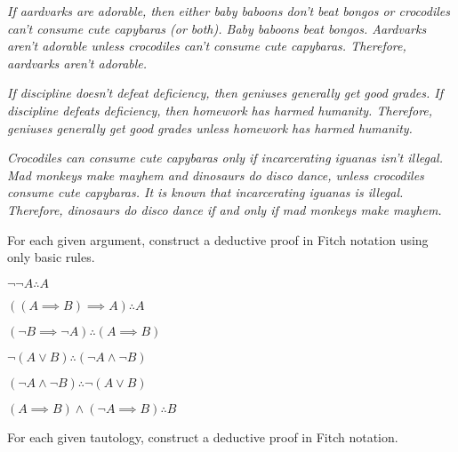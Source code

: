 \documentclass[a4paper,12pt]{article}
\begin{document}
\begin{tasks}
\begin{subtasks}
        \item \textit{If aardvarks are adorable, then either baby baboons don't beat bongos or crocodiles can't consume cute capybaras (or both).
        Baby baboons beat bongos.
        Aardvarks aren't adorable unless crocodiles can't consume cute capybaras.
        Therefore, aardvarks aren't adorable.}

        \item \textit{If discipline doesn't defeat deficiency, then geniuses generally get good grades.
        If discipline defeats deficiency, then homework has harmed humanity.
        Therefore, geniuses generally get good grades unless homework has harmed humanity.}

        \item \textit{Crocodiles can consume cute capybaras only if incarcerating iguanas isn't illegal.
        Mad monkeys make mayhem and dinosaurs do disco dance, unless crocodiles consume cute capybaras.
        It is known that incarcerating iguanas is illegal.
        Therefore, dinosaurs do disco dance if and only if mad monkeys make mayhem.}
    \end{subtasks}


    \item For each given argument, construct a deductive proof in Fitch notation using only basic rules.

    \begin{multicols}{2}
    \begin{subtasks}
        \item $\neg\neg A \therefore A$
        \item $((A \implies B) \implies A) \therefore A$
        \item $(\neg B \implies \neg A) \therefore (A \implies B)$
        \item $\neg (A \lor B) \therefore (\neg A \land \neg B)$
        \item $(\neg A \land \neg B) \therefore \neg (A \lor B)$
        \item $(A \implies B) \land (\neg A \implies B) \therefore B$
    \end{subtasks}
    \end{multicols}


    \item For each given tautology, construct a deductive proof in Fitch notation.


\end{tasks}
\end{document}
